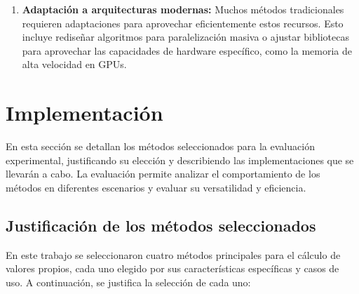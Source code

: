 \documentclass{article}
\begin{document}
\begin{enumerate}
    \item \textbf{Adaptación a arquitecturas modernas:}
    Muchos métodos tradicionales requieren adaptaciones para aprovechar eficientemente estos recursos. Esto incluye rediseñar algoritmos para paralelización masiva o ajustar bibliotecas para aprovechar las capacidades de hardware específico, como la memoria de alta velocidad en GPUs.
\end{enumerate}


\section{Implementación}
En esta sección se detallan los métodos seleccionados para la evaluación experimental, justificando su elección y describiendo las implementaciones que se llevarán a cabo. La evaluación permite analizar el comportamiento de los métodos en diferentes escenarios y evaluar su versatilidad y eficiencia.

\subsection{Justificación de los métodos seleccionados}
En este trabajo se seleccionaron cuatro métodos principales para el cálculo de valores propios, cada uno elegido por sus características específicas y casos de uso. A continuación, se justifica la selección de cada uno:
\end{document}
